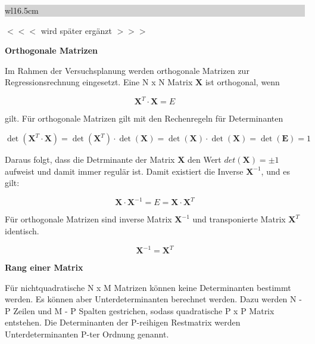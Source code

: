\noindent
\colorbox{lightgray}{%
%
\renewcommand\arraystretch{0.6}%
\begin{tabular}{ wl{16.5cm} }
{\selectfont
{}}
\end{tabular}%
}\medskip

\noindent $<<<$ wird sp\"{a}ter erg\"{a}nzt $>>>$\bigskip

\selectfont
\noindent\textbf{Orthogonale Matrizen} \smallskip

\noindent Im Rahmen der Versuchsplanung werden orthogonale Matrizen zur Regressionsrechnung eingesetzt. Eine N x N Matrix $\mathbf{X}$ ist orthogonal, wenn 

\begin{equation}\label{eq:thirteenonehundredten}
\mathbf{X}^{T} \cdot \mathbf{X}=E
\end{equation}

\noindent gilt. F\"{u}r orthogonale Matrizen gilt mit den Rechenregeln f\"{u}r Determinanten

\begin{equation}\label{eq:thirteenonehundredeleven}
\det \left(\mathbf{X}^{T} \cdot \mathbf{X}\right)=\det \left(\mathbf{X}^{T} \right)\cdot \det (\mathbf{X})=\det (\mathbf{X})\cdot \det (\mathbf{X})=\det (\mathbf{E})=1
\end{equation}

\noindent Daraus folgt, dass die Detrminante der Matrix $\mathbf{X}$ den Wert $det(\mathbf{X}) = \pm 1$ aufweist und damit immer regul\"{a}r ist. Damit existiert die Inverse $\mathbf{X}^{-1}$, und es gilt:

\begin{equation}\label{eq:thirteenonehundredtwelve}
\mathbf{X}\cdot \mathbf{X}^{-1} =E=\mathbf{X}\cdot \mathbf{X}^{T}
\end{equation}

\noindent F\"{u}r orthogonale Matrizen sind inverse Matrix $\mathbf{X}^{-1}$ und transponierte Matrix $\mathbf{X}^{T}$ identisch.

\begin{equation}\label{eq:thirteenonehundredthirteen}
\mathbf{X}^{-1} =\mathbf{X}^{T}
\end{equation}

\selectfont
\noindent\textbf{Rang einer Matrix} \smallskip

\noindent F\"{u}r nichtquadratische N x M Matrizen k\"{o}nnen keine Determinanten bestimmt werden. Es k\"{o}nnen aber Unterdeterminanten berechnet werden. Dazu werden N - P Zeilen und M - P Spalten gestrichen, sodass quadratische P x P Matrix entstehen. Die Determinanten der P-reihigen Restmatrix werden Unterdeterminanten P-ter Ordnung genannt.\newline

